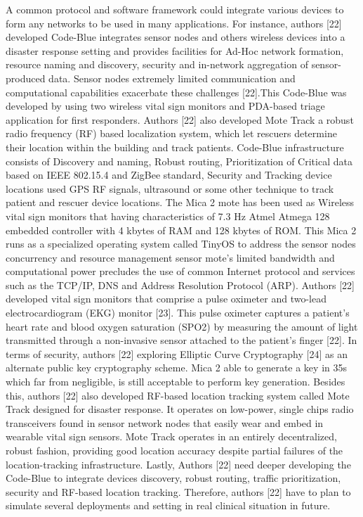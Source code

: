 \documentclass{article}
\begin{document}
A common protocol and software framework could integrate various devices to form any networks to be used in many applications. For instance, authors [22] developed Code-Blue integrates sensor nodes and others wireless devices into a disaster response setting and provides facilities for Ad-Hoc network formation, resource naming and discovery, security and in-network aggregation of sensor-produced data. Sensor nodes extremely limited communication and computational capabilities exacerbate these challenges [22].This Code-Blue was developed by using two wireless vital sign monitors and PDA-based triage application for first responders. Authors [22] also developed Mote Track a robust radio frequency (RF) based localization system, which let rescuers determine their location within the building and track patients. Code-Blue infrastructure consists of Discovery and naming, Robust routing, Prioritization of Critical data based on IEEE 802.15.4 and ZigBee standard, Security and Tracking device locations used GPS RF signals, ultrasound or some other technique to track patient and rescuer device locations. The Mica 2 mote has been used as Wireless vital sign monitors that having characteristics of 7.3 Hz Atmel Atmega 128 embedded controller with 4 kbytes of RAM and 128 kbytes of ROM. This Mica 2 runs as a specialized operating system called TinyOS to address the sensor nodes concurrency and resource management sensor mote’s limited bandwidth and computational power precludes the use of common Internet protocol and services such as the TCP/IP, DNS and Address Resolution Protocol (ARP). Authors [22] developed vital sign monitors that comprise a pulse oximeter and two-lead electrocardiogram (EKG) monitor [23]. This pulse oximeter captures a patient’s heart rate and blood oxygen saturation (SPO2) by measuring the amount of light transmitted through a non-invasive sensor attached to the patient’s finger [22]. In terms of security, authors [22] exploring Elliptic Curve Cryptography [24] as an alternate public key cryptography scheme. Mica 2 able to generate a key in 35s which far from negligible, is still acceptable to perform key generation. Besides this, authors [22] also developed RF-based location tracking system called Mote Track designed for disaster response. It operates on low-power, single chips radio transceivers found in sensor network nodes that easily wear and embed in wearable vital sign sensors. Mote Track operates in an entirely decentralized, robust fashion, providing good location accuracy despite partial failures of the location-tracking infrastructure. Lastly, Authors [22] need deeper developing the Code-Blue to integrate devices discovery, robust routing, traffic prioritization, security and RF-based location tracking. Therefore, authors [22] have to plan to simulate several deployments and setting in real clinical situation in future.    
\end{document}
